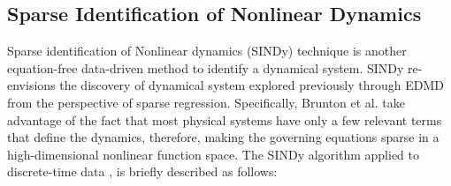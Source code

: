 \subsection{Sparse Identification of Nonlinear Dynamics}
\label{sec:SINDy}
Sparse identification of Nonlinear dynamics (SINDy) technique is another equation-free data-driven method to identify a dynamical system. SINDy re-envisions the discovery of dynamical system explored previously through EDMD from the perspective of sparse regression. Specifically,  Brunton et al. \cite{SINDy} take advantage of the fact that most physical systems have only a few relevant terms that define the dynamics, therefore, making the governing equations sparse in a high-dimensional nonlinear function space. The SINDy algorithm applied to discrete-time data \cite{Brunton_K_invariant_sub}, is briefly described as follows:
% 
